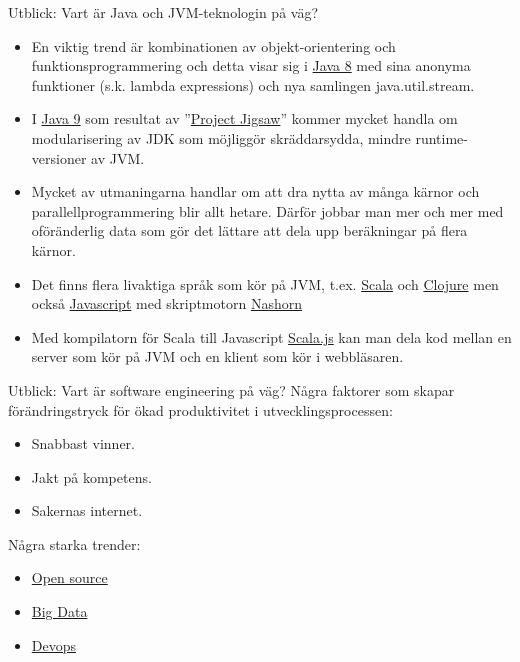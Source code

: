 \documentclass{lecturenotes}
\begin{document}
\begin{Slide}{Utblick: Vart är Java och JVM-teknologin på väg?}\footnotesize
\begin{itemize}
\item En viktig trend är kombinationen av objekt-orientering och funktionsprogrammering och detta visar sig i \href{http://www.oracle.com/technetwork/java/javase/8-whats-new-2157071.html}{Java 8} med sina anonyma funktioner (s.k. lambda expressions) och nya samlingen java.util.stream.
\item I \href{http://www.javaworld.com/article/2984263/java-platform/oracle-says-java-9-modules-will-be-a-boon-for-developers.html}{Java 9} som resultat av ''\href{http://www.infoworld.com/article/2895889/java/oracle-java-9-future-lego-like.html}{Project Jigsaw}'' kommer mycket handla om modularisering av JDK som möjliggör skräddarsydda, mindre runtime-versioner av JVM.	
\item Mycket av utmaningarna handlar om att dra nytta av många kärnor och parallellprogrammering blir allt hetare. Därför jobbar man mer och mer med oföränderlig data som gör det lättare att dela upp beräkningar på flera kärnor.
\item Det finns flera livaktiga språk som kör på JVM, t.ex.  \href{https://sv.wikipedia.org/wiki/Scala\_\%28programspr\%C3\%A5k\%29}{Scala} och  \href{https://sv.wikipedia.org/wiki/Clojure}{Clojure} men också \href{https://sv.wikipedia.org/wiki/Javascript}{Javascript} med skriptmotorn \href{https://en.wikipedia.org/wiki/Nashorn\_\%28JavaScript_engine\%29}{Nashorn} 
\item Med kompilatorn för Scala till Javascript \href{http://www.scala-js.org/}{Scala.js} kan man dela kod mellan en server som kör på JVM och en klient som kör i webbläsaren.
\end{itemize}
\end{Slide}

\begin{Slide}{Utblick: Vart är software engineering  på väg?}
Några faktorer som skapar förändringstryck för ökad produktivitet i utvecklingsprocessen:
\begin{itemize}
\item Snabbast vinner. 
\item Jakt på kompetens. 
\item Sakernas internet.
\end{itemize}
\vspace{1em}
Några starka trender:
\begin{itemize}
\item \href{https://en.wikipedia.org/wiki/Open_source}{Open source}
\item \href{https://en.wikipedia.org/wiki/Big_data}{Big Data}
\item \href{https://en.wikipedia.org/wiki/DevOps}{Devops}
\end{itemize}
\end{Slide}
\end{document}
